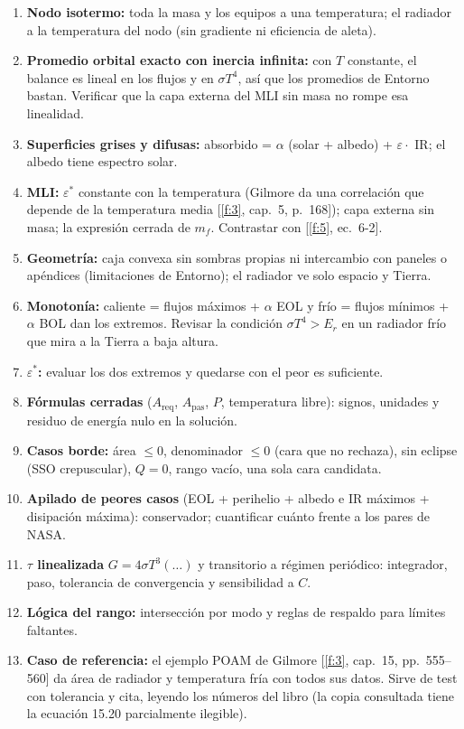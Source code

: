 \documentclass[11pt,a4paper]{article}
\newcommand{\f}[1]{\ref{f:#1}}
\begin{document}
\begin{enumerate}
  \item \textbf{Nodo isotermo:} toda la masa y los equipos a una temperatura; el radiador a la temperatura del nodo (sin gradiente ni eficiencia de aleta).
  \item \textbf{Promedio orbital exacto con inercia infinita:} con $T$ constante, el balance es lineal en los flujos y en $\sigma T^4$, así que los promedios de Entorno bastan. Verificar que la capa externa del MLI sin masa no rompe esa linealidad.
  \item \textbf{Superficies grises y difusas:} absorbido = $\alpha$ (solar + albedo) + $\varepsilon \cdot$ IR; el albedo tiene espectro solar.
  \item \textbf{MLI:} $\varepsilon^*$ constante con la temperatura (Gilmore da una correlación que depende de la temperatura media [\f{3}, cap.~5, p.~168]); capa externa sin masa; la expresión cerrada de $m_f$. Contrastar con [\f{5}, ec.~6-2].
  \item \textbf{Geometría:} caja convexa sin sombras propias ni intercambio con paneles o apéndices (limitaciones de Entorno); el radiador ve solo espacio y Tierra.
  \item \textbf{Monotonía:} caliente = flujos máximos + $\alpha$ EOL y frío = flujos mínimos + $\alpha$ BOL dan los extremos. Revisar la condición $\sigma T^4 > E_r$ en un radiador frío que mira a la Tierra a baja altura.
  \item \textbf{$\varepsilon^*$:} evaluar los dos extremos y quedarse con el peor es suficiente.
  \item \textbf{Fórmulas cerradas} ($A_\mathrm{req}$, $A_\mathrm{pas}$, $P$, temperatura libre): signos, unidades y residuo de energía nulo en la solución.
  \item \textbf{Casos borde:} área $\le 0$, denominador $\le 0$ (cara que no rechaza), sin eclipse (SSO crepuscular), $Q = 0$, rango vacío, una sola cara candidata.
  \item \textbf{Apilado de peores casos} (EOL + perihelio + albedo e IR máximos + disipación máxima): conservador; cuantificar cuánto frente a los pares de NASA.
  \item \textbf{$\tau$ linealizada} $G = 4\sigma T^3(\ldots)$ y transitorio a régimen periódico: integrador, paso, tolerancia de convergencia y sensibilidad a $C$.
  \item \textbf{Lógica del rango:} intersección por modo y reglas de respaldo para límites faltantes.
  \item \textbf{Caso de referencia:} el ejemplo POAM de Gilmore [\f{3}, cap.~15, pp.~555--560] da área de radiador y temperatura fría con todos sus datos. Sirve de test con tolerancia y cita, leyendo los números del libro (la copia consultada tiene la ecuación 15.20 parcialmente ilegible).
\end{enumerate}
\end{document}
